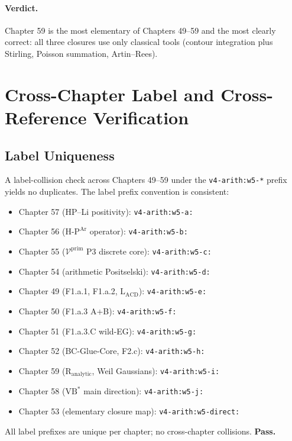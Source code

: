 \paragraph{Verdict.} Chapter 59 is the most elementary of
Chapters 49--59 and the most clearly correct: all three closures use
only classical tools (contour integration plus Stirling, Poisson
summation, Artin--Rees).

\section{Cross-Chapter Label and Cross-Reference Verification}
\label{v4-arith:w6-j:cross-chapter}

\subsection{Label Uniqueness}
\label{v4-arith:w6-j:labels}

A label-collision check across Chapters 49--59 under the
\texttt{v4-arith:w5-*} prefix yields no duplicates. The label
prefix convention is consistent:
\begin{itemize}
\item Chapter 57 (HP--Li positivity): \texttt{v4-arith:w5-a:}
\item Chapter 56 (\(\mathrm{H\text{-}P}^{\mathrm{Ar}}\) operator): \texttt{v4-arith:w5-b:}
\item Chapter 55 (\(\mathcal{V}^{\mathrm{prim}}\) P3 discrete core): \texttt{v4-arith:w5-c:}
\item Chapter 54 (arithmetic Positselski): \texttt{v4-arith:w5-d:}
\item Chapter 49 (F1.a.1, F1.a.2, \(\mathrm{L}_{\mathrm{ACD}}\)): \texttt{v4-arith:w5-e:}
\item Chapter 50 (F1.a.3 A+B): \texttt{v4-arith:w5-f:}
\item Chapter 51 (F1.a.3.C wild-EG): \texttt{v4-arith:w5-g:}
\item Chapter 52 (BC-Glue-Core, F2.c): \texttt{v4-arith:w5-h:}
\item Chapter 59 (\(\mathrm{R}_{\mathrm{analytic}}\), Weil Gaussians): \texttt{v4-arith:w5-i:}
\item Chapter 58 (\(\mathrm{VB}^{*}\) main direction): \texttt{v4-arith:w5-j:}
\item Chapter 53 (elementary closure map): \texttt{v4-arith:w5-direct:}
\end{itemize}
All label prefixes are unique per chapter; no cross-chapter
collisions. \textbf{Pass.}


